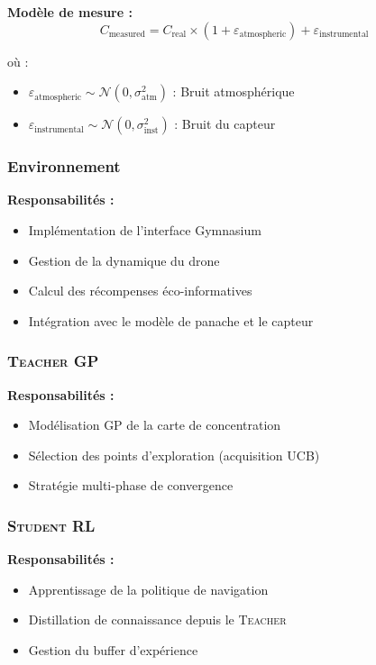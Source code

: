 \documentclass[12pt,a4paper]{article}
\newcommand{\teacher}{\textsc{Teacher}}
\newcommand{\student}{\textsc{Student}}
\newcommand{\gp}{\textsc{GP}}
\newcommand{\rl}{\textsc{RL}}
\begin{document}
\textbf{Modèle de mesure :}
\begin{equation}
C_{\text{measured}} = C_{\text{real}} \times (1 + \varepsilon_{\text{atmospheric}}) + \varepsilon_{\text{instrumental}}
\end{equation}

où :
\begin{itemize}
    \item $\varepsilon_{\text{atmospheric}} \sim \mathcal{N}(0, \sigma^2_{\text{atm}})$ : Bruit atmosphérique
    \item $\varepsilon_{\text{instrumental}} \sim \mathcal{N}(0, \sigma^2_{\text{inst}})$ : Bruit du capteur
\end{itemize}

\subsubsection{Environnement}

\textbf{Responsabilités :}
\begin{itemize}
    \item Implémentation de l'interface Gymnasium
    \item Gestion de la dynamique du drone
    \item Calcul des récompenses éco-informatives
    \item Intégration avec le modèle de panache et le capteur
\end{itemize}

\subsubsection{\teacher{} \gp{}}

\textbf{Responsabilités :}
\begin{itemize}
    \item Modélisation \gp{} de la carte de concentration
    \item Sélection des points d'exploration (acquisition UCB)
    \item Stratégie multi-phase de convergence
\end{itemize}

\subsubsection{\student{} \rl{}}

\textbf{Responsabilités :}
\begin{itemize}
    \item Apprentissage de la politique de navigation
    \item Distillation de connaissance depuis le \teacher{}
    \item Gestion du buffer d'expérience
\end{itemize}
\end{document}
